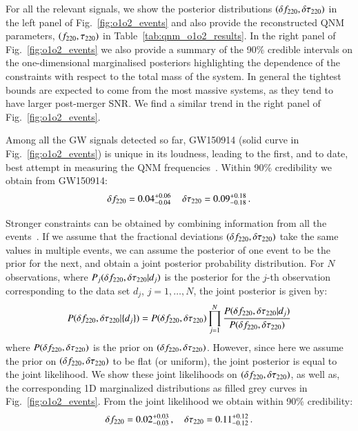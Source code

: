 For all the relevant signals, we show the posterior distributions $(\delta f_{\text{220}}, \delta \tau_{\text{220}})$ in the left panel of Fig.~\ref{fig:o1o2_events} and also provide the reconstructed QNM parameters, $(f_{\text{220}}, \tau_{\text{220}})$ in Table~\ref{tab:qnm_o1o2_results}. In the right panel  of Fig.~\ref{fig:o1o2_events} we also provide a summary of the 90\% credible intervals on the one-dimensional marginalised posteriors highlighting the dependence of the constraints with respect to the total mass of the system. In general the tightest bounds are expected to come from the most massive systems, as they tend to have larger post-merger SNR. We find a similar trend in the right panel of Fig.~\ref{fig:o1o2_events}.
 
Among all the GW signals detected so far, GW150914 (solid curve in Fig.~\ref{fig:o1o2_events}) is unique in its loudness, leading to the first, and to date, best attempt in measuring the QNM frequencies~\cite{TheLIGOScientific:2016src,Brito:2018rfr,Carullo:2019flw,Isi:2019aib}. Within 90\% credibility we obtain from GW150914: 
%
\begin{equation}\label{GW150914_delta}
\delta f_{\text{220}}=0.04^{+0.06}_{-0.04}\,\quad \delta \tau_{\text{220}}=0.09^{+0.18}_{-0.18}\,.
\end{equation}

Stronger constraints can be obtained by combining information from all the events~\cite{Abbott:2020jks}. If we assume that the fractional deviations $(\delta f_{\text{220}},\delta \tau_{\text{220}})$ take the same values in multiple events, we can assume
the posterior of one event to be the prior for the next, and obtain a
joint posterior probability distribution. For $N$ observations, where
$P_j(\delta f_{\text{220}}, \delta \tau_{\text{220}} | d_j)$ is the posterior for the $j$-th
observation corresponding to the data set $d_j$, $j=1,\dots,N$, the joint
posterior is given by:
%
\begin{equation}
P(\delta f_{\text{220}}, \delta \tau_{\text{220}} | \{d_j\}) = P(\delta f_{\text{220}}, \delta \tau_{\text{220}}) \prod _{j=1}^N \frac{P(\delta f_{\text{220}}, \delta \tau_{\text{220}} | d_j) }{P(\delta f_{\text{220}}, \delta \tau_{\text{220}})}
\end{equation}
%
where $P(\delta f_{\text{220}}, \delta \tau_{\text{220}})$ is the prior on $(\delta f_{\text{220}},
\delta \tau_{\text{220}})$. However, since here we assume the prior on $(\delta f_{\text{220}},
\delta \tau_{\text{220}})$ to be flat (or uniform), the joint posterior is equal to
the joint likelihood. We show these joint likelihoods on $(\delta f_{\text{220}}, \delta \tau_{\text{220}})$, as well as, the corresponding 1D marginalized distributions as filled grey curves in Fig.~\ref{fig:o1o2_events}. From the joint likelihood we obtain within 90\% credibility: 
%
\begin{equation}
\delta f_{\text{220}}=0.02^{+0.03}_{-0.03}\,,\quad \delta \tau_{\text{220}}=0.11^{+0.12}_{-0.12}\,.
\end{equation}
%


